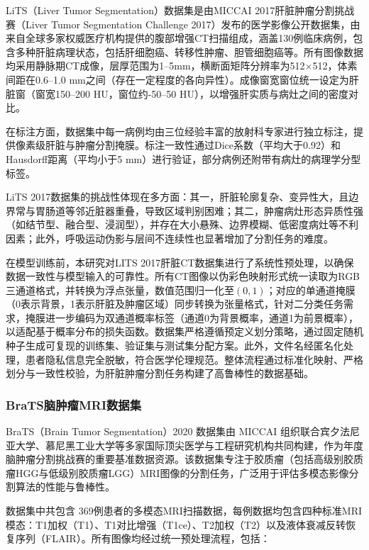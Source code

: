 LiTS（Liver Tumor Segmentation）数据集是由MICCAI 2017肝脏肿瘤分割挑战赛（Liver Tumor Segmentation Challenge 2017）发布的医学影像公开数据集，由来自全球多家权威医疗机构提供的腹部增强CT扫描组成，涵盖130例临床病例，包含多种肝脏病理状态，包括肝细胞癌、转移性肿瘤、胆管细胞癌等\cite{Bilic_2023}。所有图像数据均采用静脉期CT成像，层厚范围为1–5mm，横断面矩阵分辨率为512×512，体素间距在0.6–1.0 mm之间（存在一定程度的各向异性）。成像窗宽窗位统一设定为肝脏窗（窗宽150–200 HU，窗位约-50–50 HU），以增强肝实质与病灶之间的密度对比。

在标注方面，数据集中每一病例均由三位经验丰富的放射科专家进行独立标注，提供像素级肝脏与肿瘤分割掩膜。标注一致性通过Dice系数（平均大于0.92）和Hausdorff距离（平均小于5 mm）进行验证，部分病例还附带有病灶的病理学分型标签。

LiTS 2017数据集的挑战性体现在多方面：其一，肝脏轮廓复杂、变异性大，且边界常与胃肠道等邻近脏器重叠，导致区域判别困难；其二，肿瘤病灶形态异质性强（如结节型、融合型、浸润型），并存在大小悬殊、边界模糊、低密度病灶等不利因素；此外，呼吸运动伪影与层间不连续性也显著增加了分割任务的难度。

在模型训练前，本研究对LITS 2017肝脏CT数据集进行了系统性预处理，以确保数据一致性与模型输入的可靠性。所有CT图像以伪彩色映射形式统一读取为RGB三通道格式，并转换为浮点张量，数值范围归一化至$(0,1)$；对应的单通道掩膜（0表示背景，1表示肝脏及肿瘤区域）同步转换为张量格式，针对二分类任务需求，掩膜进一步编码为双通道概率标签（通道0为背景概率，通道1为前景概率），以适配基于概率分布的损失函数。数据集严格遵循预定义划分策略，通过固定随机种子生成可复现的训练集、验证集与测试集分配方案。此外，文件名经匿名化处理，患者隐私信息完全脱敏，符合医学伦理规范。整体流程通过标准化映射、严格划分与一致性校验，为肝脏肿瘤分割任务构建了高鲁棒性的数据基础。

\subsubsection{BraTS脑肿瘤MRI数据集}

BraTS（Brain Tumor Segmentation）2020 数据集由 MICCAI 组织联合宾夕法尼亚大学、慕尼黑工业大学等多家国际顶尖医学与工程研究机构共同构建，作为年度脑肿瘤分割挑战赛的重要基准数据资源\cite{menze2015}。该数据集专注于胶质瘤（包括高级别胶质瘤HGG与低级别胶质瘤LGG）MRI图像的分割任务，广泛用于评估多模态影像分割算法的性能与鲁棒性。

数据集中共包含 369例患者的多模态MRI扫描数据，每例数据均包含四种标准MRI模态：T1加权（T1）、T1对比增强（T1ce）、T2加权（T2）以及液体衰减反转恢复序列（FLAIR）。所有图像均经过统一预处理流程，包括：

